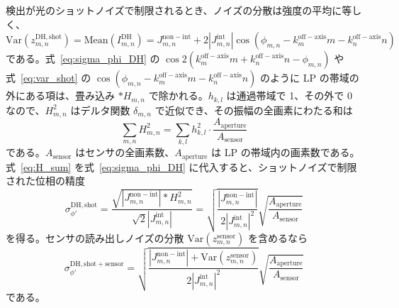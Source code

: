 検出が光のショットノイズで制限されるとき、ノイズの分散は強度の平均に等しく、
\begin{equation}
\label{eq:var_shot}
\mathrm{Var}(z_{m,n}^{\mathrm{DH,shot}}) = \mathrm{Mean}(I_{m,n}^{\mathrm{DH}}) = J_{m,n}^{\mathrm{non-int}} + 2|J_{m,n}^{\mathrm{int}}| \cos(\phi_{m,n} - k_m^{\mathrm{off-axis}}m - k_n^{\mathrm{off-axis}}n)
\end{equation}
である。式~\eqref{eq:sigma_phi_DH} の $\cos 2(k_m^{\mathrm{off-axis}}m + k_n^{\mathrm{off-axis}}n - \phi_{m,n})$ や式~\eqref{eq:var_shot} の $\cos(\phi_{m,n} - k_m^{\mathrm{off-axis}}m - k_n^{\mathrm{off-axis}}n)$ のように LP の帯域の外にある項は、畳み込み $\ast H_{m,n}$ で除かれる。$h_{k,l}$ は通過帯域で 1、その外で 0 なので、$H_{m,n}^2$ はデルタ関数 $\delta_{m,n}$ で近似でき、その振幅の全画素にわたる和は
\begin{equation}
\label{eq:H_sum}
\sum_{m,n} H_{m,n}^2 = \sum_{k,l} h_{k,l}^2 \cdot \frac{A_{\mathrm{aperture}}}{A_{\mathrm{sensor}}}
\end{equation}
である。$A_{\mathrm{sensor}}$ はセンサの全画素数、$A_{\mathrm{aperture}}$ は LP の帯域内の画素数である。式~\eqref{eq:H_sum} を式~\eqref{eq:sigma_phi_DH} に代入すると、ショットノイズで制限された位相の精度
\begin{equation}
\label{eq:sigma_shot}
\sigma_{\phi'}^{\mathrm{DH,shot}} = \frac{\sqrt{|J_{m,n}^{\mathrm{non-int}}| \ast H_{m,n}^2}}{\sqrt{2}|J_{m,n}^{\mathrm{int}}|} = \sqrt{\frac{|J_{m,n}^{\mathrm{non-int}}|}{2|J_{m,n}^{\mathrm{int}}|^2}} \sqrt{\frac{A_{\mathrm{aperture}}}{A_{\mathrm{sensor}}}}
\end{equation}
を得る。センサの読み出しノイズの分散 $\mathrm{Var}(z_{m,n}^{\mathrm{sensor}})$ を含めるなら
\begin{equation}
\sigma_{\phi'}^{\mathrm{DH,shot+sensor}} = \sqrt{\frac{|J_{m,n}^{\mathrm{non-int}}| + \mathrm{Var}(z_{m,n}^{\mathrm{sensor}})}{2|J_{m,n}^{\mathrm{int}}|^2}} \sqrt{\frac{A_{\mathrm{aperture}}}{A_{\mathrm{sensor}}}}
\end{equation}
である。

